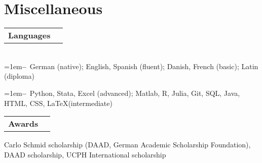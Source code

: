 \documentclass[A4,11pt]{article}
\makeatletter
\newcommand{\Subheading}[4]{   
    \begin{tabular*}{\textwidth}[t]{@{}l @{\extracolsep{\fill}} r@{}}
        \textbf{#1}\textit{\small #2} & \footnotesize #3 \\
    \end{tabular*}
    \small #4 
    \vspace{7pt}
}
\newcommand{\myitem}[1]{\hangindent=1em\hangafter=1\textbf{--}~#1\par}
\makeatother
\begin{document}
\section{Miscellaneous}

    \Subheading
        {Languages}{}{}
        {\\
        \myitem{German (native); English, Spanish (fluent); Danish, French (basic); Latin (diploma)}
        \myitem{Python, Stata, Excel (advanced); Matlab, R, Julia, Git, SQL, Java, HTML, CSS, \LaTeX\space(intermediate)}
        }
    

    \Subheading
        {Awards}{}{}
        {Carlo Schmid scholarship (DAAD, German Academic Scholarship Foundation), 
        DAAD scholarship, 
        UCPH International scholarship
        } 



\vfill
{}
\end{document}

